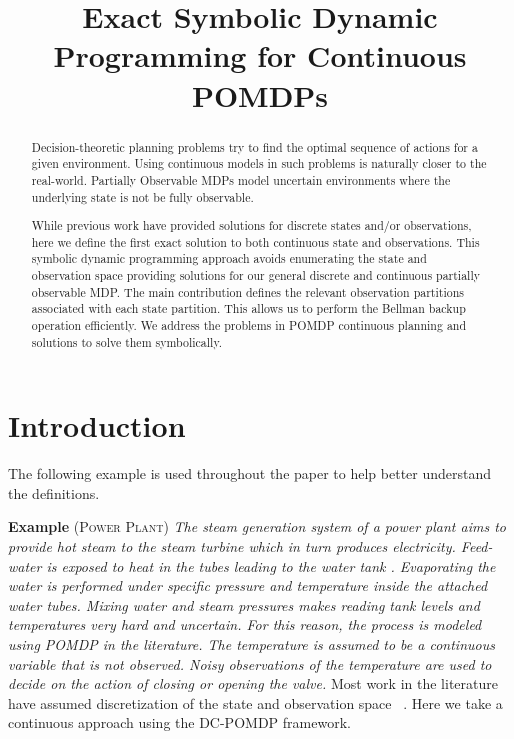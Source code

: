 \documentclass{article}
\title{Exact Symbolic Dynamic Programming for Continuous POMDPs}
\author{}
\begin{document}
 
 
\maketitle 
 
\begin{abstract} 
Decision-theoretic planning problems try to find the optimal sequence of actions for a given environment. Using continuous models in such problems is naturally closer to the real-world. Partially Observable MDPs model uncertain environments where the underlying state is not be fully observable. 

While previous work have provided solutions for discrete states and/or observations, here we define the first exact solution to both continuous state and observations. This symbolic dynamic programming approach avoids enumerating the state and observation space providing solutions for our general discrete and continuous partially observable MDP. The main contribution defines the relevant observation partitions associated with each state partition. This allows us to perform the Bellman backup operation efficiently. We address the problems in POMDP continuous planning and solutions to solve them symbolically. %
\end{abstract} 
 
\section{Introduction} 

The following example is used throughout the paper to help better understand the definitions. 

\textbf{Example} \textsc{(Power Plant)}
\emph{The steam generation system of a power plant aims to provide hot steam to the steam turbine which in turn produces electricity. Feed-water is exposed to heat in the tubes leading to the water tank . Evaporating the water is performed under specific pressure and temperature inside the attached water tubes. 
Mixing water and steam pressures makes reading tank levels and temperatures very hard and uncertain. For this reason, the process is modeled using POMDP in the literature. The temperature is assumed to be a continuous variable that is not observed. Noisy observations of the temperature are used to decide on the action of closing or opening the valve.}
Most work in the literature have assumed discretization of the state and observation space ~\cite{steam2}. Here we take a continuous approach using the DC-POMDP framework.
\end{document}
